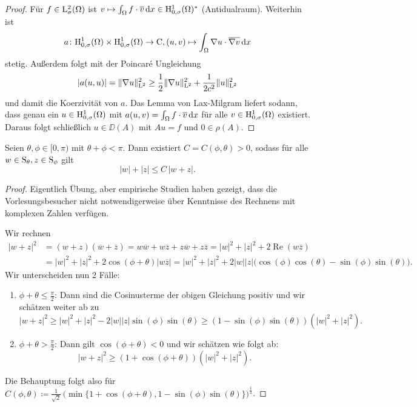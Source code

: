 \begin{proof}
  Für $f \in \mathrm{L}_\sigma^2(\Omega)$ ist $v \mapsto \int_\Omega f \cdot \overline v \, {\operatorname{d}\!{x}} \in \mathrm{H}_{0,\sigma}^1(\Omega)^*$ (Antidualraum).
  Weiterhin ist $$a \colon \mathrm{H}_{0,\sigma}^1(\Omega) \times \mathrm{H}_{0,\sigma}^1(\Omega) \to \mathrm{C}, (u,v) \mapsto \int_\Omega \nabla u \cdot \overline{\nabla v} \, {\operatorname{d}\!{x}}$$ stetig.
  Außerdem folgt mit der Poincar\'e Ungleichung
  $$
  |a(u,u)| = \|\nabla u\|_{\mathrm{L}^2}^2 \geq \frac{1}{2} \|\nabla u\|_{\mathrm{L}^2}^2 + \frac{1}{2 c^2} \|u\|_{\mathrm{L}^2}^2
  $$
  und damit die Koerzivität von $a$.
  Das Lemma von Lax-Milgram liefert sodann, dass genau ein $u \in \mathrm{H}_{0,\sigma}^1(\Omega)$ mit $a(u,v) = \int_\Omega f \cdot \overline v \, {\operatorname{d}\!{x}}$ für alle $v \in \mathrm{H}_{0,\sigma}^1(\Omega)$ existiert.
  Daraus folgt schließlich $u \in \DD(A)$ mit $A u = f$ und $0 \in \rho(A)$.
\end{proof}

\begin{lem}
  \label{lem:inverseTriangle}
  Seien $\theta, \phi \in [0,\pi)$ mit $\theta + \phi < \pi$.
    Dann existiert $C = C(\phi,\theta) > 0$, sodass für alle $w \in \mathrm{S}_\theta, z \in \mathrm{S}_\phi$ gilt
    $$
    |w| + |z| \leq C \,|w + z|.
    $$
\end{lem}

\begin{proof}
  Eigentlich Übung, aber empirische Studien haben gezeigt, dass die Vorlesungsbesucher nicht notwendigerweise über Kenntnisse des Rechnens mit komplexen Zahlen verfügen.

  Wir rechnen
  \begin{align*}
    |w + z|^2 
    &= (w + z)(\overline w + \overline z)  
    = w \overline w + w \overline z + z \overline w + z \overline z 
    = |w|^2 + |z|^2 + 2 \operatorname{Re}(w \overline z) \\
    &= |w|^2 + |z|^2 + 2 \cos (\phi + \theta) |w \overline z|
    = |w|^2 + |z|^2 + 2|w||z| \big(\cos(\phi)\cos(\theta) - \sin(\phi)\sin(\theta)\big).
  \end{align*}
  Wir unterscheiden nun 2 Fälle:
  \begin{enumerate}[1.]
    \item $\phi +  \theta \leq \frac{\pi}{2}$: Dann sind die Cosinusterme der obigen Gleichung positiv und wir schätzen weiter ab zu
      $$
      |w + z|^2 \geq |w|^2 + |z|^2 - 2|w||z|\sin(\phi)\sin(\theta) \geq (1 - \sin(\phi)\sin(\theta)) (|w|^2 + |z|^2).
      $$
    \item $\phi + \theta > \frac{\pi}{2}$: Dann gilt $\cos(\phi + \theta) < 0$ und wir schätzen wie folgt ab:
      $$
      |w + z|^2 \geq (1 + \cos(\phi + \theta)) (|w|^2 + |z|^2 ).
      $$
  \end{enumerate}
  Die Behauptung folgt also für $C(\phi,\theta) \coloneqq \frac{1}{\sqrt{2}}\, \Big(\min\{1 + \cos(\phi + \theta), 1 - \sin(\phi)\sin(\theta)\}\Big)^{\frac{1}{2}}$.
\end{proof}


